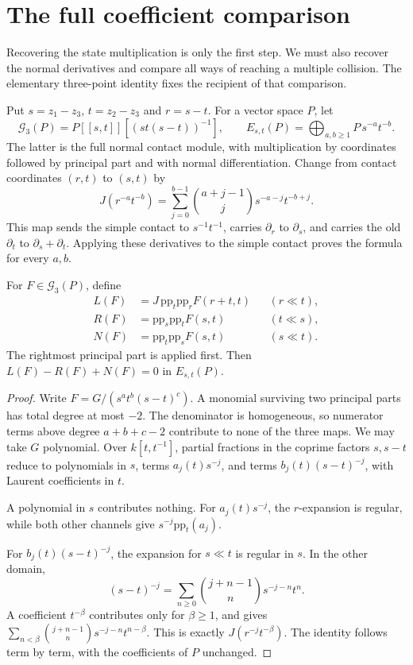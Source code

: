 \section{The full coefficient comparison}
\label{cycmp:sec:regular-comparison}

Recovering the state multiplication is only the first step. We must
also recover the normal derivatives and compare all ways of reaching
a multiple collision. The elementary three-point identity fixes the
recipient of that comparison.

Put $s=z_1-z_3$, $t=z_2-z_3$ and $r=s-t$. For a vector space $P$,
let
\[
 \mathcal G_3(P)=P[[s,t]][(st(s-t))^{-1}],
 \qquad E_{s,t}(P)=\bigoplus_{a,b\ge1}P\,s^{-a}t^{-b}.
\]
The latter is the full normal contact module, with multiplication by
coordinates followed by principal part and with normal differentiation.
Change from contact coordinates $(r,t)$ to $(s,t)$ by
\begin{equation}\label{cycmp:eq:contact-change}
 J(r^{-a}t^{-b})=
   \sum_{j=0}^{b-1}\binom{a+j-1}{j}s^{-a-j}t^{-b+j}.
\end{equation}
This map sends the simple contact to $s^{-1}t^{-1}$, carries
$\partial_r$ to $\partial_s$, and carries the old $\partial_t$
to $\partial_s+\partial_t$. Applying these derivatives to the
simple contact proves the formula for every $a,b$.

\begin{lemma}\label{cycmp:lem:three-channels}
For $F\in\mathcal G_3(P)$, define
\[
\begin{aligned}
 L(F)&=J\,\mathrm{pp}_t\mathrm{pp}_rF(r+t,t)
                                     &&(r\ll t),\\
 R(F)&=\mathrm{pp}_s\mathrm{pp}_tF(s,t)
                                     &&(t\ll s),\\
 N(F)&=\mathrm{pp}_t\mathrm{pp}_sF(s,t)
                                     &&(s\ll t).
\end{aligned}
\]
The rightmost principal part is applied first. Then
$L(F)-R(F)+N(F)=0$ in $E_{s,t}(P)$.
\end{lemma}

\begin{proof}
Write $F=G/(s^at^b(s-t)^c)$. A monomial surviving two
principal parts has total degree at most $-2$. The denominator
is homogeneous, so numerator terms above degree $a+b+c-2$
contribute to none of the three maps. We may take $G$ polynomial.
Over $k[t,t^{-1}]$, partial fractions in the coprime factors
$s,s-t$ reduce to polynomials in $s$, terms $a_j(t)s^{-j}$,
and terms $b_j(t)(s-t)^{-j}$, with Laurent coefficients in $t$.

A polynomial in $s$ contributes nothing. For $a_j(t)s^{-j}$,
the $r$-expansion is regular, while both other channels give
$s^{-j}\mathrm{pp}_t(a_j)$.

For $b_j(t)(s-t)^{-j}$, the
expansion for $s\ll t$ is regular in $s$. In the other domain,
\[
 (s-t)^{-j}=\sum_{n\ge0}\binom{j+n-1}{n}s^{-j-n}t^n.
\]
A coefficient $t^{-\beta}$ contributes only for $\beta\ge1$,
and gives
$\sum_{n<\beta}\binom{j+n-1}{n}s^{-j-n}t^{n-\beta}$.
This is exactly $J(r^{-j}t^{-\beta})$. The identity follows
term by term, with the coefficients of $P$ unchanged.
\end{proof}

